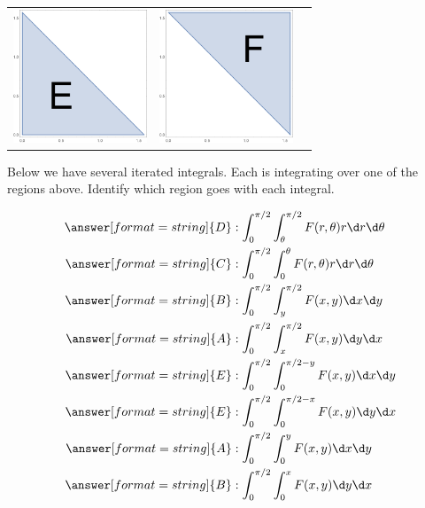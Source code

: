\documentclass{ximera}
\begin{document}
\begin{exercise}
\begin{center}
\begin{tabular}{ccc}
      \includegraphics[width=4cm]{region4.png} &
      \includegraphics[width=4cm]{region3.png}
    \end{tabular}
  \end{center}
  Below we have several iterated integrals. Each is integrating over one
  of the regions above. Identify which region goes with each integral.

  \begin{align*}
    \answer[format=string]{D}&: \int_0^{\pi/2} \int_{\theta}^{\pi/2}F(r,\theta)r \d r\d\theta \\
    \answer[format=string]{C}&: \int_0^{\pi/2} \int_0^{\theta}F(r,\theta)r \d r\d \theta \\
    \answer[format=string]{B}&: \int_0^{\pi/2} \int_{y}^{\pi/2}F(x,y) \d x\d y\\ 
    \answer[format=string]{A}&: \int_0^{\pi/2} \int_{x}^{\pi/2}F(x,y) \d y\d x\\
    \answer[format=string]{E}&: \int_0^{\pi/2} \int_{0}^{\pi/2-y}F(x,y) \d x\d y\\
    \answer[format=string]{E}&: \int_0^{\pi/2} \int_{0}^{\pi/2-x}F(x,y) \d y\d x\\
    \answer[format=string]{A}&: \int_0^{\pi/2} \int_{0}^{y}F(x,y) \d x\d y\\
    \answer[format=string]{B}&: \int_0^{\pi/2} \int_{0}^{x}F(x,y) \d y\d x
  \end{align*}

\end{exercise}
\end{document}
